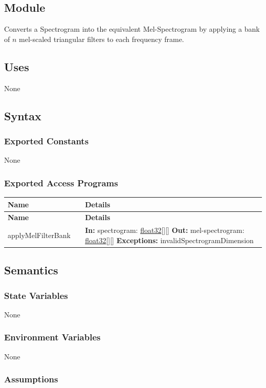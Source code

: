 \documentclass[12pt, titlepage]{article}
\newenvironment{apitable}{%
\begin{center}
\begin{longtable}{|p{0.3\linewidth}|p{0.7\linewidth}|} 
\hline
\textbf{Name} & \textbf{Details} \\
\hline
\endfirsthead
\hline
\textbf{Name} & \textbf{Details} \\
\hline
\endhead
\hline
\endfoot
\hline
\endlastfoot
}{%
\end{longtable}
\end{center}
}
\newcommand{\apifunc}[4]{%
#1 & 
\textbf{In:} #2 \newline
\textbf{Out:} #3 \newline
\textbf{Exceptions:} #4 \\
\hline
}
\begin{document}
\subsection{Module}

Converts a Spectrogram into the equivalent Mel-Spectrogram by applying a bank of
$n$ mel-scaled triangular filters to each frequency frame.

\subsection{Uses}

None

\subsection{Syntax}

\subsubsection{Exported Constants}

None

\subsubsection{Exported Access Programs}
\begin{apitable}
  \apifunc{applyMelFilterBank}
    {spectrogram: \hyperref[generic:float32]{float32}[][]}
    {mel-spectrogram: \hyperref[generic:float32]{float32}[][]}
    {invalidSpectrogramDimension}
\end{apitable}

\subsection{Semantics}
\subsubsection{State Variables}

None

\subsubsection{Environment Variables}

None

\subsubsection{Assumptions}
\end{document}
